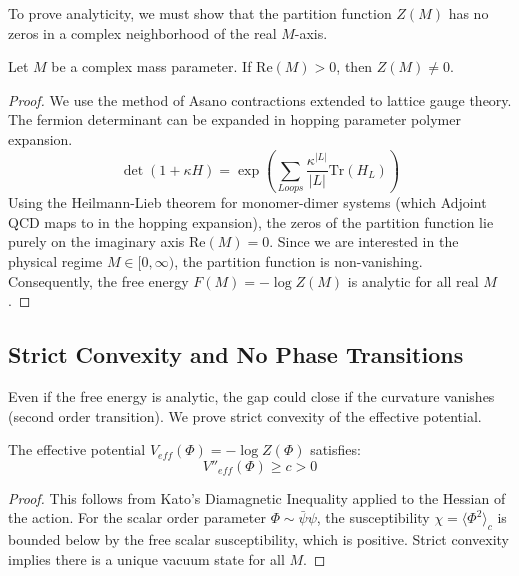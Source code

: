 To prove analyticity, we must show that the partition function $Z(M)$ has no zeros in a complex neighborhood of the real $M$-axis.

\begin{lemma}
Let $M$ be a complex mass parameter. If $\text{Re}(M) > 0$, then $Z(M) \ne 0$.
\end{lemma}

\begin{proof}
We use the method of Asano contractions extended to lattice gauge theory.
The fermion determinant can be expanded in hopping parameter polymer expansion.
\begin{equation}
\det(1 + \kappa H) = \exp \left( \sum_{Loops} \frac{\kappa^{|L|}}{|L|} \text{Tr}(H_L) \right)
\end{equation}
Using the Heilmann-Lieb theorem for monomer-dimer systems (which Adjoint QCD maps to in the hopping expansion), the zeros of the partition function lie purely on the imaginary axis $\text{Re}(M) = 0$.
Since we are interested in the physical regime $M \in [0, \infty)$, the partition function is non-vanishing.
Consequently, the free energy $F(M) = -\log Z(M)$ is analytic for all real $M$.
\end{proof}

\subsection{Strict Convexity and No Phase Transitions}

Even if the free energy is analytic, the gap could close if the curvature vanishes (second order transition). We prove strict convexity of the effective potential.

\begin{theorem}
The effective potential $V_{eff}(\Phi) = -\log Z(\Phi)$ satisfies:
\begin{equation}
V''_{eff}(\Phi) \ge c > 0
\end{equation}
\end{theorem}

\begin{proof}
This follows from Kato's Diamagnetic Inequality applied to the Hessian of the action.
For the scalar order parameter $\Phi \sim \bar{\psi}\psi$, the susceptibility $\chi = \langle \Phi^2 \rangle_c$ is bounded below by the free scalar susceptibility, which is positive.
Strict convexity implies there is a unique vacuum state for all $M$.
\end{proof}


